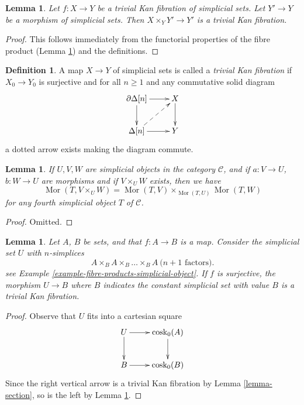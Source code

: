 \documentclass{stacks-project}
\theoremstyle{plain}
\newtheorem{lemma}[subsection]{Lemma}
\theoremstyle{definition}
\newtheorem{definition}[subsection]{Definition}
\theoremstyle{remark}
\numberwithin{equation}{subsection}
\def\Mor{\mathop{\mathrm{Mor}}\nolimits}
\begin{document}
\begin{lemma}
\label{lemma-trivial-kan-base-change}
Let $f : X \to Y$ be a trivial Kan fibration of simplicial sets.
Let $Y' \to Y$ be a morphism of simplicial sets.
Then $X \times_Y Y' \to Y'$ is a trivial Kan fibration.
\end{lemma}

\begin{proof}
This follows immediately from the functorial properties of the fibre
product (Lemma \ref{lemma-fibre-product}) and the definitions.
\end{proof}

\begin{definition}
\label{definition-trivial-kan}
A map $X \to Y$ of simplicial sets is called a {\it trivial Kan fibration}
if $X_0 \to Y_0$ is surjective and for all $n \geq 1$ and any commutative
solid diagram
$$
\xymatrix{
\partial \Delta[n] \ar[r] \ar[d] & X \ar[d] \\
\Delta[n] \ar[r] \ar@{-->}[ru] & Y
}
$$
a dotted arrow exists making the diagram commute.
\end{definition}

\begin{lemma}
\label{lemma-fibre-product}
If $U, V, W$ are simplicial objects in the category $\mathcal{C}$,
and if $a : V \to U$, $b : W \to U$ are morphisms
and if $V \times_U W$ exists, then we have
$$
\Mor(T, V \times_U W) =
\Mor(T, V) \times_{\Mor(T, U)}
\Mor(T, W)
$$
for any fourth simplicial object $T$ of $\mathcal{C}$.
\end{lemma}

\begin{proof}
Omitted.
\end{proof}

\begin{lemma}
\label{lemma-cosk-minus-one-equivalence}
Let $A$, $B$ be sets, and that $f : A \to B$ is a map. Consider the simplicial
set $U$ with $n$-simplices
$$
A \times_B A \times_B \ldots \times_B A\ (n + 1 \text{ factors)}.
$$
see Example \ref{example-fibre-products-simplicial-object}.
If $f$ is surjective, the morphism $U \to B$
where $B$ indicates the constant simplicial set with value $B$
is a trivial Kan fibration.
\end{lemma}

\begin{proof}
Observe that $U$ fits into a cartesian square
$$
\xymatrix{
U \ar[d] \ar[r] & \text{cosk}_0(A) \ar[d] \\
B \ar[r] & \text{cosk}_0(B)
}
$$
Since the right vertical arrow is a trivial Kan fibration by
Lemma \ref{lemma-section}, so is the left by
Lemma \ref{lemma-trivial-kan-base-change}.
\end{proof}
\end{document}
